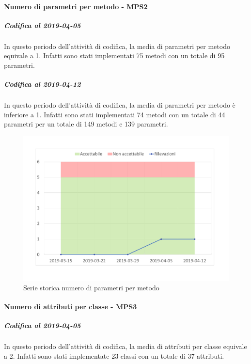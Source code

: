 \paragraph{Numero di parametri per metodo - MPS2}
\subparagraph{Codifica al 2019-04-05}
In questo periodo dell'attività di codifica, la media di parametri per metodo equivale a 1. Infatti sono stati implementati 75 metodi con un totale di 95 parametri.

\subparagraph{Codifica al 2019-04-12}
In questo periodo dell'attività di codifica, la media di parametri per metodo è inferiore a 1. Infatti sono stati implementati 74 metodi con un totale di 44 parametri per un totale di 149 metodi e 139 parametri.
\begin{figure}[H]
	\centering
	\includegraphics[scale=0.6]{images/resoconto/MPS2Chart.pdf}
	\caption{Serie storica numero di parametri per metodo}	
\end{figure}

\paragraph{Numero di attributi per classe - MPS3}
\subparagraph{Codifica al 2019-04-05}
In questo periodo dell'attività di codifica, la media di attributi per classe equivale a 2. Infatti sono stati implementate 23 classi con un totale di 37 attributi.

